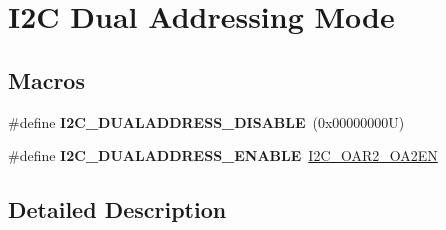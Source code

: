 \hypertarget{group___i2_c___d_u_a_l___a_d_d_r_e_s_s_i_n_g___m_o_d_e}{}\section{I2C Dual Addressing Mode}
\label{group___i2_c___d_u_a_l___a_d_d_r_e_s_s_i_n_g___m_o_d_e}
\subsection*{Macros}
\begin{DoxyCompactItemize}
\item 
\mbox{\label{group___i2_c___d_u_a_l___a_d_d_r_e_s_s_i_n_g___m_o_d_e_gacb8f4a1fd543e5ef2c9e7711fc9b5a67}} 
\#define {\bfseries I2\+C\+\_\+\+D\+U\+A\+L\+A\+D\+D\+R\+E\+S\+S\+\_\+\+D\+I\+S\+A\+B\+LE}~(0x00000000\+U)
\item 
\mbox{\label{group___i2_c___d_u_a_l___a_d_d_r_e_s_s_i_n_g___m_o_d_e_gae33ff5305d9f38d857cff1774f481fab}} 
\#define {\bfseries I2\+C\+\_\+\+D\+U\+A\+L\+A\+D\+D\+R\+E\+S\+S\+\_\+\+E\+N\+A\+B\+LE}~\hyperlink{group___peripheral___registers___bits___definition_gaa6ec62ffdf8a682e5e0983add8fdfa26}{I2\+C\+\_\+\+O\+A\+R2\+\_\+\+O\+A2\+EN}
\end{DoxyCompactItemize}


\subsection{Detailed Description}

